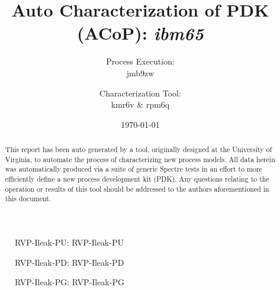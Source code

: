 \documentclass[letterpaper]{article}
\title{Auto Characterization of PDK (ACoP): \emph{ibm65}}
\author{Process Execution: \\jmb9zw \and Characterization Tool: \\kmr6v \& rpm6q}
\date{\today}
\begin{document}


\maketitle
\begin{abstract}
This report has been auto generated by a tool, originally designed at the University of Virginia, to automate the process of characterizing new process models. All data herein was automatically produced via a suite of generic Spectre tests in an effort to more efficiently define a new process development kit (PDK). Any questions relating to the operation or results of this tool should be addressed to the authors aforementioned in this document.
\end{abstract}

\newpage
\listoffigures 
\newpage


\begin{figure}
\begin{center}
\caption{RVP-Ileak-PU: RVP-Ileak-PU}
\end{center}
\end{figure}
\clearpage


\begin{figure}
\begin{center}
\caption{RVP-Ileak-PD: RVP-Ileak-PD}
\end{center}
\end{figure}
\clearpage


\begin{figure}
\begin{center}
\caption{RVP-Ileak-PG: RVP-Ileak-PG}
\end{center}
\end{figure}
\clearpage
\end{document}
